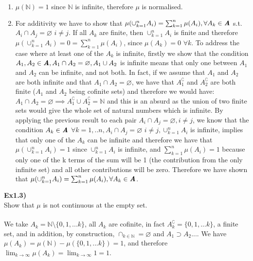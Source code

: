 \documentclass[12pt,mythesisstyle]{report}
\begin{document}
\begin{enumerate}
\item \(\mu(\mathbb{N})=1\) since \(\mathbb{N}\) is infinite, therefore \(\mu\) is normalised.
\item For additivity we have to show that \(\mu(\cup_{k=1}^nA_i)=\sum_{k=1}^n\mu(A_i), \forall A_k\in\textbf{\textit{A}}\) s.t. \(A_i\cap A_j=\varnothing\) \(i\neq j\). If all \(A_k\) are finite, then \(\cup_{k=1}^nA_i\) is finite and therefore \(\mu(\cup_{k=1}^nA_i)=0=\sum_{k=1}^n\mu(A_i)\), since \(\mu(A_k)=0\) \(\forall k\). To address the case where at least one of the \(A_k\) is infinite, firstly we show that the condition \(A_1, A_2\in\textbf{\textit{A}}, A_1\cap A_2=\varnothing, A_1\cup A_2\) is infinite means that only one between \(A_1\) and \(A_2\) can be infinite, and not both. In fact, if we assume that \(A_1\) and \(A_2\) are both infinite and that \(A_1\cap A_2=\varnothing\), we have that \(A_1^\complement\) and \(A_2^\complement\) are both finite (\(A_1\) and \(A_2\) being cofinite sets) and therefore we would have: \(A_1\cap A_2=\varnothing\implies A_1^\complement\cup A_2^\complement=\mathbb{N}\) and this is an absurd as the union of two finite sets would give the whole set of natural numbers which is infinite. By applying the previous result to each pair \(A_i\cap A_j=\varnothing,  i\neq j\), we know that the condition \(A_k\in\textbf{\textit{A}}\) \(\forall k=1,..n,A_i\cap A_j=\varnothing\) \(i\neq j,\cup_{k=1}^nA_i\) is infinite, implies that only one of the \(A_k\) can be infinite and therefore we have that \(\mu(\cup_{k=1}^nA_i)=1\) since \(\cup_{k=1}^nA_i\) is infinite, and \(\sum_{k=1}^n\mu(A_i)=1\) because only one of the k terms of the sum will be 1 (the contribution from the only infinite set) and all other contributions will be zero. Therefore we have shown that \(\mu(\cup_{k=1}^nA_i)=\sum_{k=1}^n\mu(A_i), \forall A_k\in\textbf{\textit{A}}\).
\end{enumerate}
\textbf{Ex1.3)}\\
Show that \(\mu\) is not continuous at the empty set.\\\\
We take $A_k=\mathbb{N}\setminus\{0,1,...k\}$, all $A_k$ are cofinite, in fact $A_k^\complement=\{0,1,...k\}$, a finite set, and in addition, by construction, $\cap_{k\in\mathbb{N}}=\varnothing$ and $A_1\supset A_2...$. We have $\mu(A_k)=\mu(\mathbb{N})-\mu(\{0,1,...k\})=1$, and therefore $\lim_{k\rightarrow\infty}\mu(A_k)=\lim_{k\rightarrow\infty}1=1$.
\\\\
\end{document}
